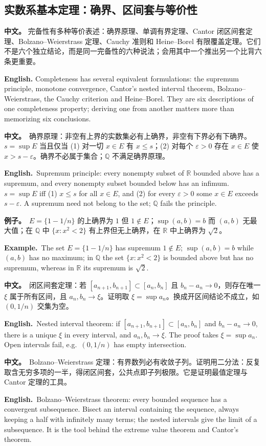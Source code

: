 \documentclass[UTF8,11pt,a4paper]{ctexart}
\newcommand{\R}{\mathbb{R}}
\newcommand{\Q}{\mathbb{Q}}
\newcommand{\BOTH}[2]{\par\noindent\textbf{中文。}\ #1\par\noindent\textbf{English.}\ #2\par}
\newcommand{\EX}[2]{\par\noindent\textbf{例子。}\ #1\par\noindent\textbf{Example.}\ #2\par}
\newcommand{\APS}[2]{\par\noindent\textbf{中文。} #1\par\noindent\textbf{English.} #2\par\smallskip}
\begin{document}
\subsection{实数系基本定理：确界、区间套与等价性}
\APS{完备性有多种等价表述：确界原理、单调有界定理、Cantor 闭区间套定理、Bolzano--Weierstrass 定理、Cauchy 准则和 Heine--Borel 有限覆盖定理。它们不是六个独立结论，而是同一完备性的六种说法；会用其中一个推出另一个比背六条更重要。}{Completeness has several equivalent formulations: the supremum principle, monotone convergence, Cantor's nested interval theorem, Bolzano--Weierstrass, the Cauchy criterion and Heine--Borel. They are six descriptions of one completeness property; deriving one from another matters more than memorizing six conclusions.}
\BOTH{确界原理：非空有上界的实数集必有上确界，非空有下界必有下确界。$s=\sup E$ 当且仅当 (1) 对一切 $x\in E$ 有 $x\le s$；(2) 对每个 $\varepsilon>0$ 存在 $x\in E$ 使 $x>s-\varepsilon$。确界不必属于集合；$\Q$ 不满足确界原理。}{Supremum principle: every nonempty subset of $\R$ bounded above has a supremum, and every nonempty subset bounded below has an infimum. $s=\sup E$ iff (1) $x\le s$ for all $x\in E$, and (2) for every $\varepsilon>0$ some $x\in E$ exceeds $s-\varepsilon$. A supremum need not belong to the set; $\Q$ fails the principle.}
\EX{$E=\{1-1/n\}$ 的上确界为 $1$ 但 $1\notin E$；$\sup(a,b)=b$ 而 $(a,b)$ 无最大值；在 $\Q$ 中 $\{x:x^2<2\}$ 有上界但无上确界，在 $\R$ 中上确界为 $\sqrt2$。}{The set $E=\{1-1/n\}$ has supremum $1\notin E$; $\sup(a,b)=b$ while $(a,b)$ has no maximum; in $\Q$ the set $\{x:x^2<2\}$ is bounded above but has no supremum, whereas in $\R$ its supremum is $\sqrt2$.}
\BOTH{闭区间套定理：若 $[a_{n+1},b_{n+1}]\subset[a_n,b_n]$ 且 $b_n-a_n\to0$，则存在唯一 $\xi$ 属于所有区间，且 $a_n,b_n\to\xi$。证明取 $\xi=\sup a_n$。换成开区间结论不成立，如 $(0,1/n)$ 交集为空。}{Nested interval theorem: if $[a_{n+1},b_{n+1}]\subset[a_n,b_n]$ and $b_n-a_n\to0$, there is a unique $\xi$ in every interval, and $a_n,b_n\to\xi$. The proof takes $\xi=\sup a_n$. Open intervals fail, e.g.\ $(0,1/n)$ has empty intersection.}
\BOTH{Bolzano--Weierstrass 定理：有界数列必有收敛子列。证明用二分法：反复取含无穷多项的一半，得闭区间套，公共点即子列极限。它是证明最值定理与 Cantor 定理的工具。}{Bolzano--Weierstrass theorem: every bounded sequence has a convergent subsequence. Bisect an interval containing the sequence, always keeping a half with infinitely many terms; the nested intervals give the limit of a subsequence. It is the tool behind the extreme value theorem and Cantor's theorem.}
\end{document}
